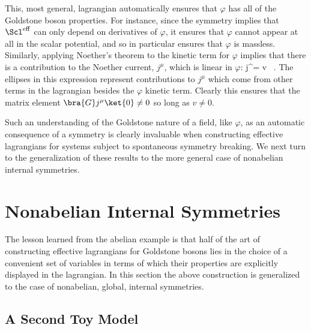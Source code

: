 \documentclass[12pt,epsf]{report}
\def\leff{\Scl^{\rm eff}}
\begin{document}
This, most general, lagrangian automatically ensures that
$\varphi$ has all of the Goldstone boson properties. For
instance, since the symmetry implies that $\leff$ can only
depend on derivatives of 
$\varphi$, it ensures that $\varphi$ cannot appear at all
in the scalar potential, and so in particular ensures that
$\varphi$ is massless. Similarly, applying Noether's
theorem to the kinetic term for $\varphi$ implies that
there is a contribution to the Noether current, $j^\mu$,
which is linear in $\varphi$: 
%
\eq
\label{abelgbncex}
j^\mu =  \; v \;  \, . \eeq
%
The ellipses in this expression represent contributions to
$j^\mu$ which come from other terms in the lagrangian
besides the 
$\varphi$ kinetic term. Clearly this ensures that the
matrix element $\bra{G} j^\mu \ket{0} \neq 0$ so long as $v
\neq 0$.

Such an understanding of the Goldstone nature of a field,
like 
$\varphi$, as an automatic consequence of a symmetry is
clearly invaluable when constructing effective lagrangians
for systems subject to spontaneous symmetry breaking. We
next turn to the generalization of these results to the
more general case of nonabelian internal symmetries.

\section{Nonabelian Internal Symmetries}

The lesson learned from the abelian example is that half of
the art of constructing effective lagrangians for Goldstone
bosons lies in the choice of a convenient set of variables
in terms of which their properties are explicitly displayed
in the lagrangian. In this section the above construction is
generalized to the case of nonabelian, global, internal
symmetries.

\subsection{A Second Toy Model}
\end{document}
